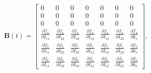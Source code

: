 \documentclass[lineno, pdflatex,sn-mathphys-ay]{sn-jnl}
\theoremstyle{thmstyleone}%
\theoremstyle{thmstyletwo}%
\theoremstyle{thmstylethree}%
\renewcommand{\vec}[1]{\boldsymbol{#1}}
\begin{document}
	
	
\begin{equation}
\vec{B}(t) = 
\begin{bmatrix}
0 & 0 & 0 & 0 & 0 & 0 & 0 \\
0 & 0 & 0 & 0 & 0 & 0 & 0 \\
0 & 0 & 0 & 0 & 0 & 0 & 0 \\
\frac{\partial f_4}{\partial I_{11}} &
\frac{\partial f_4}{\partial I_{22}} &
\frac{\partial f_4}{\partial I_{33}} &
\frac{\partial f_4}{\partial I_{12}} &
\frac{\partial f_4}{\partial I_{13}} &
\frac{\partial f_4}{\partial I_{23}} &
\frac{\partial f_4}{\partial k_{\mathrm{o}}} \\
\frac{\partial f_5}{\partial I_{11}} &
\frac{\partial f_5}{\partial I_{22}} &
\frac{\partial f_5}{\partial I_{33}} &
\frac{\partial f_5}{\partial I_{12}} &
\frac{\partial f_5}{\partial I_{13}} &
\frac{\partial f_5}{\partial I_{23}} &
\frac{\partial f_5}{\partial k_{\mathrm{o}}} \\
\frac{\partial f_6}{\partial I_{11}} &
\frac{\partial f_6}{\partial I_{22}} &
\frac{\partial f_6}{\partial I_{33}} &
\frac{\partial f_6}{\partial I_{12}} &
\frac{\partial f_6}{\partial I_{13}} &
\frac{\partial f_6}{\partial I_{23}} &
\frac{\partial f_6}{\partial k_{\mathrm{o}}}
\end{bmatrix},
\end{equation}
	
\end{document}
